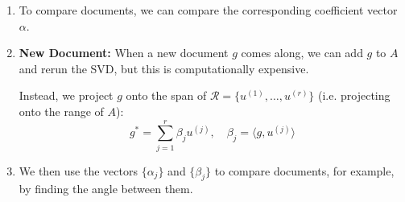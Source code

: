 \begin{example}
\begin{enumerate}
        \item To compare documents, we can compare the corresponding coefficient vector \( \alpha \).
    
        \item \textbf{New Document:} When a new document \( g \) comes along, we can add \( g \) to \( A \) and rerun the SVD, but this is computationally expensive.
    
        Instead, we project \( g \) onto the span of \( \mathcal{R} = \{ u^{(1)}, \ldots, u^{(r)} \} \) (i.e. projecting onto the range of \( A \)):
        \[
        g^* = \sum_{j=1}^{r} \beta_j u^{(j)}, \quad \beta_j = \langle g, u^{(j)} \rangle
        \]
    
        \item We then use the vectors \( \{ \alpha_j \} \) and \( \{ \beta_j \} \) to compare documents, for example, by finding the angle between them.
    \end{enumerate}

\end{example}

